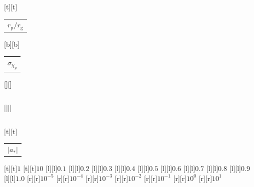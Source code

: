 %    
%
%
\begin{psfrags}%
\psfragscanon%
%
[t][t]{\color[rgb]{0,0,0}\setlength{\tabcolsep}{0pt}\begin{tabular}{c}{\Large$r_\mathrm{p}/r_\mathrm{g}$}\end{tabular}}%
[b][b]{\color[rgb]{0,0,0}\setlength{\tabcolsep}{0pt}\begin{tabular}{c}{\Large$\sigma_{\chi_\mathrm{p}}$}\end{tabular}}%
[][]{\color[rgb]{0,0,0}\setlength{\tabcolsep}{0pt}\begin{tabular}{c} \end{tabular}}%
[][]{\color[rgb]{0,0,0}\setlength{\tabcolsep}{0pt}\begin{tabular}{c} \end{tabular}}%
[t][t]{\color[rgb]{0,0,0}\setlength{\tabcolsep}{0pt}\begin{tabular}{c}{\Large$\left|a_\ast\right|$}\end{tabular}}%
%
[t][t]{$1$}%
[t][t]{$10$}%
%
[l][l]{$0.1$}%
[l][l]{$0.2$}%
[l][l]{$0.3$}%
[l][l]{$0.4$}%
[l][l]{$0.5$}%
[l][l]{$0.6$}%
[l][l]{$0.7$}%
[l][l]{$0.8$}%
[l][l]{$0.9$}%
[l][l]{$1.0$}%
[r][r]{$10^{-5}$}%
[r][r]{$10^{-4}$}%
[r][r]{$10^{-3}$}%
[r][r]{$10^{-2}$}%
[r][r]{$10^{-1}$}%
[r][r]{$10^{0}$}%
[r][r]{$10^{1}$}%
%
%
\end{psfrags}%
%

